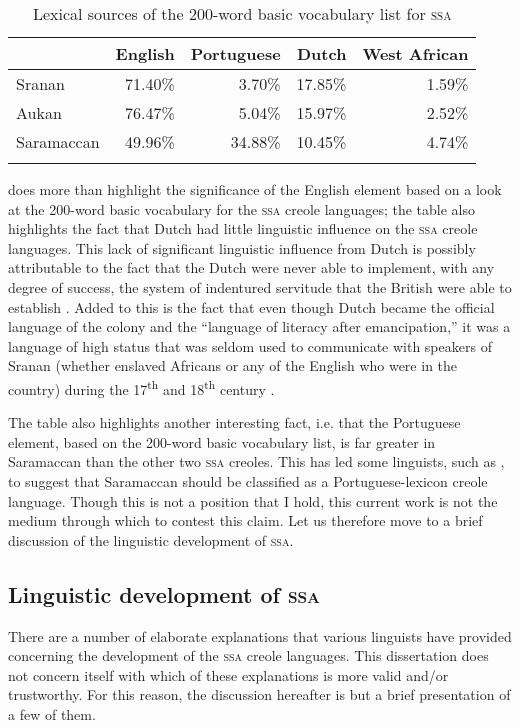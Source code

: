 \begin{table}
\begin{tabular}{lrrrr} 
\lsptoprule
\textbf& English  & Portuguese  & Dutch &  West African  \\
\midrule
Sranan &  71.40\% & 3.70\% & 17.85\% & 1.59\%  \\
Aukan &  76.47\% & 5.04\% & 15.97\% & 2.52\%  \\
Saramaccan & 49.96\% & 34.88\% & 10.45\% & 4.74\%  \\  
\lspbottomrule 
\end{tabular}
\caption{Lexical sources of the 200-word basic vocabulary list for \textsc{ssa} }
\label{Table1.1}
\end{table}

  does more than highlight the significance of the English element based on a look at the 200-word basic vocabulary for the \textsc{ssa}  creole languages; the table also highlights the fact that Dutch had little linguistic influence on the \textsc{ssa}  creole languages. This lack of significant linguistic influence from Dutch is possibly attributable to the fact that the Dutch were never able to implement, with any degree of success, the system of indentured servitude that the British were able to establish \citep{Buddingh95}. Added to this is the fact that even though Dutch became the official language of the colony and the ``language of literacy after emancipation,'' it was a language of high status that was seldom used to communicate with speakers of Sranan (whether enslaved Africans or any of the English who were in the country) during the 17\textsuperscript{th} and 18\textsuperscript{th} century \citep[279]{Healy93}.

The table also highlights another interesting fact, i.e. that the Portuguese element, based on the 200-word basic vocabulary list, is far greater in Saramaccan than the other two \textsc{ssa}  creoles. This has led some linguists, such as  \citet{Perl95}, to suggest that Saramaccan should be classified as a Portuguese-lexicon creole language. Though this is not a position that I hold, this current work is not the medium through which to contest this claim. Let us therefore move to a brief discussion of the linguistic development of \textsc{ssa}.

\subsection {Linguistic development of \textsc{ssa} }\label{1.2.3}
There are a number of elaborate explanations that various linguists have provided concerning the development of the \textsc{ssa}  creole languages. This dissertation does not concern itself with which of these explanations is more valid and/or trustworthy. For this reason, the discussion hereafter is but a brief presentation of a few of them.

